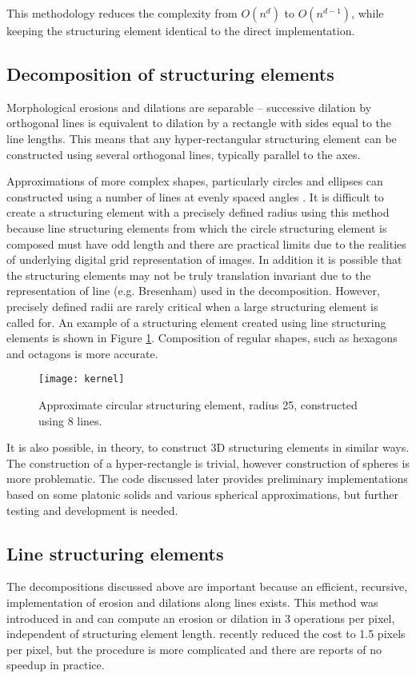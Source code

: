 \documentclass{InsightArticle}
\begin{document}
This methodology reduces the complexity from $O(n^d)$ to $O(n^{d-1})$,
while keeping the structuring element identical to the direct
implementation.

\subsection{Decomposition of structuring elements}
\label{sect:MMdecomp}
Morphological erosions and dilations are separable -- successive
dilation by orthogonal lines is equivalent to dilation by a rectangle
with sides equal to the line lengths. This means that any
hyper-rectangular structuring element can be constructed using several
orthogonal lines, typically parallel to the axes.

Approximations of more complex shapes, particularly circles and
ellipses can constructed using a number of lines at evenly spaced
angles \cite{Adams93}. It is difficult to create a structuring element
with a precisely defined radius using this method because line
structuring elements from which the circle structuring element is
composed must have odd length and there are practical limits due to
the realities of underlying digital grid representation of images. In
addition it is possible that the structuring elements may not be truly
translation invariant due to the representation of line
(e.g. Bresenham) used in the decomposition. However, precisely defined
radii are rarely critical when a large structuring element is called
for. An example of a structuring element created using line
structuring elements is shown in Figure
\ref{fig:circledecomposition}. Composition of regular shapes, such as
hexagons and octagons is more accurate.

\begin{figure}[htbp]
\centering
\texttt{[image: kernel]}
\caption{Approximate circular structuring element, radius 25, constructed using 8 lines.\label{fig:circledecomposition}}
\end{figure}

It is also possible, in theory, to construct 3D structuring elements
in similar ways. The construction of a hyper-rectangle is trivial,
however construction of spheres is more problematic. The code
discussed later provides preliminary implementations based on some
platonic solids and various spherical approximations, but further
testing and development is needed.

\subsection{Line structuring elements}
The decompositions discussed above are important because an efficient,
recursive, implementation of erosion and dilations along lines
exists. This method was introduced in \cite{Gil1993,vanHerk1992a} and
can compute an erosion or dilation in 3 operations per pixel,
independent of structuring element length. \cite{Gil2000} recently
reduced the cost to 1.5 pixels per pixel, but the procedure is more
complicated and there are reports of no speedup in practice.
\end{document}
